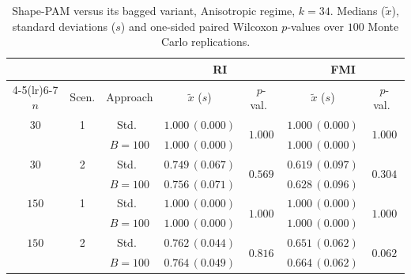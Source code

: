 \begin{table}[h]
\centering
\caption{Shape-PAM versus its bagged variant, Anisotropic regime, $k=34$. Medians ($\tilde x$), standard deviations ($s$) and one-sided paired Wilcoxon $p$-values over $100$ Monte Carlo replications.}
\label{tab:pam-aniso-k34}
\footnotesize
\begin{tabular}{cc c cc cc}
\toprule
& & & \multicolumn{2}{c}{\textbf{RI}} & \multicolumn{2}{c}{\textbf{FMI}} \\
\cmidrule(lr){4-5}\cmidrule(lr){6-7}
$n$ & Scen. & Approach & $\tilde x$ ($s$) & $p$-val.\ & $\tilde x$ ($s$) & $p$-val.\ \\
\midrule
$30$ & 1 & Std.\ & $1.000\,(0.000)$ & \multirow{2}{*}{$1.000$} & $1.000\,(0.000)$ & \multirow{2}{*}{$1.000$} \\
     &   & $B{=}100$ & $1.000\,(0.000)$ & & $1.000\,(0.000)$ & \\
$30$ & 2 & Std.\ & $0.749\,(0.067)$ & \multirow{2}{*}{$0.569$} & $0.619\,(0.097)$ & \multirow{2}{*}{$0.304$} \\
     &   & $B{=}100$ & $0.756\,(0.071)$ & & $0.628\,(0.096)$ & \\
$150$ & 1 & Std.\ & $1.000\,(0.000)$ & \multirow{2}{*}{$1.000$} & $1.000\,(0.000)$ & \multirow{2}{*}{$1.000$} \\
     &   & $B{=}100$ & $1.000\,(0.000)$ & & $1.000\,(0.000)$ & \\
$150$ & 2 & Std.\ & $0.762\,(0.044)$ & \multirow{2}{*}{$0.816$} & $0.651\,(0.062)$ & \multirow{2}{*}{$0.062$} \\
     &   & $B{=}100$ & $0.764\,(0.049)$ & & $0.664\,(0.062)$ & \\
\bottomrule
\end{tabular}
\end{table}

